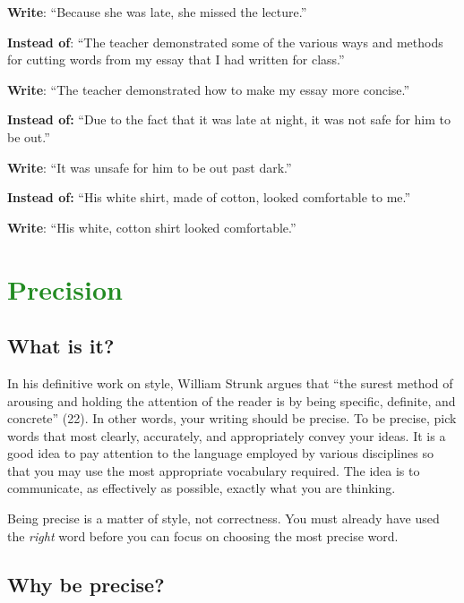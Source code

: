 \begin{enumerate}
    	\textbf{Write}: ``Because she was late, she missed the lecture.''
 
    	\textbf{Instead of}:  	``The teacher demonstrated some of the various ways and methods
                               	for cutting words from my essay that I had written for class.''
 
    	\textbf{Write}:           	``The teacher demonstrated how to make my essay more concise.''
 
    	\textbf{Instead of:}  	``Due to the fact that it was late at night, it was not safe for him to
                                	be out.''
 
    	\textbf{Write}:                    	``It was unsafe for him to be out past dark.''
 
 
    	\textbf{Instead of:}  	``His white shirt, made of cotton, looked comfortable to me.''
 
    	\textbf{Write}:        	          	``His white, cotton shirt looked comfortable.''

\end{enumerate}

\section{\textcolor{ForestGreen}{Precision}}
 
\subsection{What is it?}
 
In his definitive work on style, William Strunk argues that ``the surest method of arousing and holding the attention of the reader is by being specific, definite, and concrete'' (22). In other words, your writing should be precise. To be precise, pick words that most clearly, accurately, and appropriately convey your ideas.  It is a good idea to pay attention to the language employed by various disciplines so that you may use the most appropriate vocabulary required. The idea is to communicate, as effectively as possible, exactly what you are thinking.
 
Being precise is a matter of style, not correctness. You must already have used the \emph{right} word before you can focus on choosing the most precise word.
 
\subsection{Why be precise?}
 
